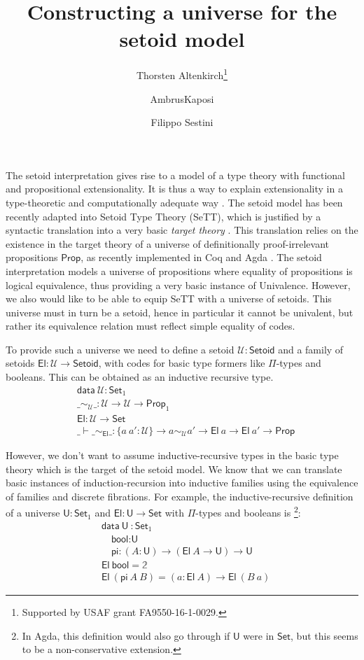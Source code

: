 \documentclass{easychair}
\title{Constructing a universe for the setoid model}
\author{Thorsten Altenkirch\inst{1}\thanks{Supported by USAF grant
    FA9550-16-1-0029.} \and AmbrusKaposi \inst{2} \and Filippo Sestini\inst{1}}
\institute{
  School of Computer Science, University of Nottingham, UK\\
  \email{\{psztxa,psxfs5\}@nottingham.ac.uk}
  \and
  E{\"o}tv{\"o}s Lor{\'a}nd University, Budapest, Hungary\\
  \email{akaposi@inf.elte.hu}
}
\newcommand{\setoidU}{\mathcal{U}}
\newcommand{\Set}{\textsf{Set}}
\newcommand{\Prop}{\textsf{Prop}}
\newcommand{\Setoid}{\textsf{Setoid}}
\newcommand{\U}{\textsf{U}}
\newcommand{\El}{\textsf{El}}
\providecommand\mathbbm{\mathbb}
\begin{document}
\maketitle

The setoid interpretation gives rise to a model of a type theory with functional
and propositional extensionality. It is thus a way to explain extensionality in
a type-theoretic and computationally adequate way \cite{setoid-model}. The
setoid model has been recently adapted into Setoid Type Theory (SeTT), which is
justified by a syntactic translation into a very basic \emph{target theory}
\cite{mpc19}. This translation relies on the existence in the target theory of a
universe of definitionally proof-irrelevant propositions $\Prop$, as recently
implemented in Coq and Agda \cite{gilbert}. The setoid interpretation models a
universe of propositions where equality of propositions is logical equivalence,
thus providing a very basic instance of Univalence. However, we also would like
to be able to equip SeTT with a universe of setoids. This universe must in turn
be a setoid, hence in particular it cannot be univalent, but rather its
equivalence relation must reflect simple equality of codes.

To provide such a universe we need to define a setoid $\setoidU : \Setoid$ and a
family of setoids $\El : \setoidU \to \Setoid$, with codes for basic type
formers like $\Pi$-types and booleans. This can be obtained as an inductive
recursive type.
%
\begin{align*}
  & \textsf{data} \ \setoidU : \Set_1 \\
  & \_\sim_\setoidU\_ : \setoidU \to \setoidU \to \Prop_1 \\
  & \El : \setoidU \to \Set \\
  & \_\vdash\_\sim_\El\_ : \{a\ a' : \setoidU\} \to a \sim_\setoidU a' \to \El\ a \to \El\ a' \to \Prop
\end{align*}

However, we don't want to assume inductive-recursive types in the basic type
theory which is the target of the setoid model. We know that we can translate
basic instances of induction-recursion into inductive families using the
equivalence of families and discrete fibrations. For example, the
inductive-recursive definition of a universe $\U:\Set_1$ and $\El : \U \to
\Set$ with $\Pi$-types and booleans is
\footnote{In Agda, this definition would also go through if $\U$ were in $\Set$, but
  this seems to be a non-conservative extension.}:
%
\begin{align*}
  & \textsf{data}\ \U\ : \Set_1 \\
  & \quad \textsf{bool} : \U \\
  & \quad \textsf{pi} : (A : \U) \to (\El\ A \to \U) \to \U \\
  & \El\ \textsf{bool} = \mathbbm{2} \\
  & \El\ (\textsf{pi}\ A\ B) = (a : \El\ A) \to \El\ (B\ a)
\end{align*}
\end{document}
